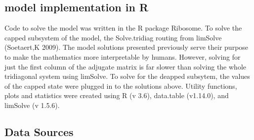 \documentclass[review]{elsarticle}
\newcommand{\imax}{\ensuremath{i_{\max}}\xspace}
\begin{document}





\subsection{model implementation in R}
Code to solve the model was written in the R package Ribosome. To solve the capped subsystem of the model, the Solve.tridiag routing from limSolve (Soetaert,K 2009). The model solutions presented previously serve their purpose to make the mathematics more interpretable by humans. However, solving for just the first column of the adjugate matrix is far slower than solving the whole tridiagonal system using limSolve. To solve for the deapped subsytem, the values of the capped state were plugged in to the solutions above. Utility functions, plots and statistics were created using R (v 3.6),  data.table (v1.14.0), and limSolve (v 1.5.6). 
		
\subsection{Data Sources}
\end{document}
